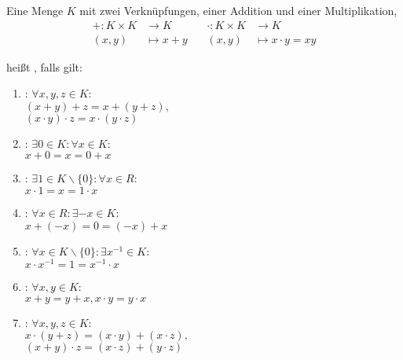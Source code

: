 Eine Menge $K$ mit zwei Verknüpfungen, einer Addition und einer Multiplikation, 
\begin{align*}
    + : K \times K & \longrightarrow K \hspace{1cm} &
    \cdot : K \times K & \longrightarrow K
    \\
    (x, y) & \longmapsto x + y &
    (x, y) & \longmapsto x \cdot y = xy
\end{align*}

heißt , falls gilt:

\begin{enumerate}[label=(K\arabic*)]

    \item {}: $\forall x, y, z \in K :$\\$(x+y)+z = x+(y+z),$\\$(x \cdot y) \cdot z = x \cdot (y \cdot z)$

    \item {}: $\exists 0 \in K : \forall x \in K :$\\$x+0=x=0+x$

    \item {}: $\exists 1 \in K \backslash \{0\} : \forall x \in R :$\\$x \cdot 1=x=1 \cdot x$

    \item {}: $\forall x \in R : \exists -x \in K :$\\$x + (-x) = 0 = (-x) + x$

    \item {}: $\forall x \in K \backslash \{0\} : \exists x^{-1} \in K :$\\$x \cdot x^{-1} = 1 = x^{-1} \cdot x$

    \item {}: $\forall x, y \in K :$\\$x+y=y+x, x \cdot y = y \cdot x$

    \item {}: $\forall x, y, z \in K :$\\$x \cdot (y+z) = (x \cdot y) + (x \cdot z),$\\$(x+y) \cdot z = (x \cdot z) + (y \cdot z)$

\end{enumerate}
